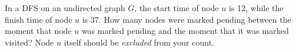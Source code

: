 \begin{prob}
    In a DFS on an undirected graph $G$, the start time of node $u$ is 12, while the
    finish time of node $u$ is 37. How many nodes were marked pending between the moment
    that node $u$ was marked pending and the moment that it was marked visited? Node
    $u$ itself should be \emph{excluded} from your count.


\end{prob}
